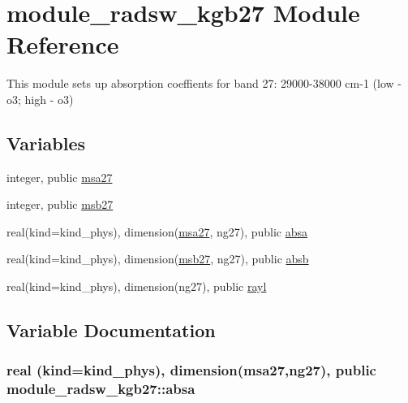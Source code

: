 \hypertarget{namespacemodule__radsw__kgb27}{}\section{module\+\_\+radsw\+\_\+kgb27 Module Reference}
\label{namespacemodule__radsw__kgb27}


This module sets up absorption coeffients for band 27\+: 29000-\/38000 cm-\/1 (low -\/ o3; high -\/ o3)  


\subsection*{Variables}
\begin{DoxyCompactItemize}
\item 
integer, public \hyperlink{namespacemodule__radsw__kgb27_abdab838f66aba14b64bce733f797cf26}{msa27}
\item 
integer, public \hyperlink{namespacemodule__radsw__kgb27_a3b2e57a0d4596aead5cad5aaca74850d}{msb27}
\item 
real(kind=kind\+\_\+phys), dimension(\hyperlink{namespacemodule__radsw__kgb27_abdab838f66aba14b64bce733f797cf26}{msa27}, ng27), public \hyperlink{namespacemodule__radsw__kgb27_a300726e54369a14bfbe6b486f5aab01b}{absa}
\item 
real(kind=kind\+\_\+phys), dimension(\hyperlink{namespacemodule__radsw__kgb27_a3b2e57a0d4596aead5cad5aaca74850d}{msb27}, ng27), public \hyperlink{namespacemodule__radsw__kgb27_a8edb349c908e6950e0d18f293dd1b6ea}{absb}
\item 
real(kind=kind\+\_\+phys), dimension(ng27), public \hyperlink{namespacemodule__radsw__kgb27_aca4c6e06d1cd46568048a035c6726f1d}{rayl}
\end{DoxyCompactItemize}


\subsection{Variable Documentation}
\subsubsection[{\texorpdfstring{absa}{absa}}]{\setlength{\rightskip}{0pt plus 5cm}real (kind=kind\+\_\+phys), dimension({\bf msa27},ng27), public module\+\_\+radsw\+\_\+kgb27\+::absa}\hypertarget{namespacemodule__radsw__kgb27_a300726e54369a14bfbe6b486f5aab01b}{}\label{namespacemodule__radsw__kgb27_a300726e54369a14bfbe6b486f5aab01b}


